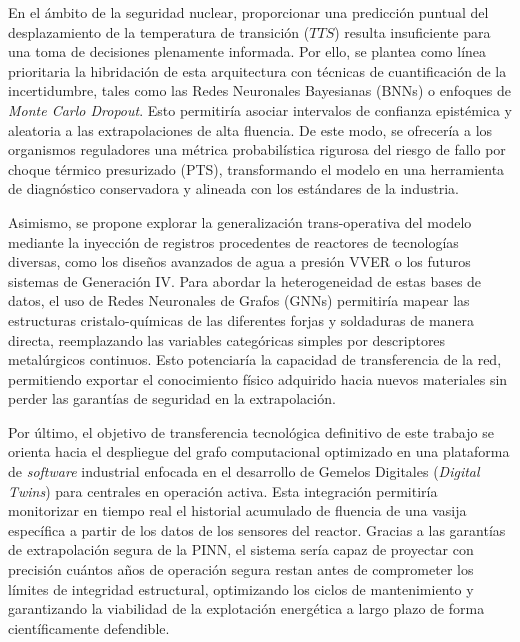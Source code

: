 \documentclass[a4paper, 12pt, twocolumn]{book}
\begin{document}
En el ámbito de la seguridad nuclear, proporcionar una predicción puntual del desplazamiento de la temperatura de transición ($TTS$) resulta insuficiente para una toma de decisiones plenamente informada. Por ello, se plantea como línea prioritaria la hibridación de esta arquitectura con técnicas de cuantificación de la incertidumbre, tales como las Redes Neuronales Bayesianas (BNNs) o enfoques de \textit{Monte Carlo Dropout}. Esto permitiría asociar intervalos de confianza epistémica y aleatoria a las extrapolaciones de alta fluencia. De este modo, se ofrecería a los organismos reguladores una métrica probabilística rigurosa del riesgo de fallo por choque térmico presurizado (PTS), transformando el modelo en una herramienta de diagnóstico conservadora y alineada con los estándares de la industria.

Asimismo, se propone explorar la generalización trans-operativa del modelo mediante la inyección de registros procedentes de reactores de tecnologías diversas, como los diseños avanzados de agua a presión VVER o los futuros sistemas de Generación IV. Para abordar la heterogeneidad de estas bases de datos, el uso de Redes Neuronales de Grafos (GNNs) permitiría mapear las estructuras cristalo-químicas de las diferentes forjas y soldaduras de manera directa, reemplazando las variables categóricas simples por descriptores metalúrgicos continuos. Esto potenciaría la capacidad de transferencia de la red, permitiendo exportar el conocimiento físico adquirido hacia nuevos materiales sin perder las garantías de seguridad en la extrapolación.

Por último, el objetivo de transferencia tecnológica definitivo de este trabajo se orienta hacia el despliegue del grafo computacional optimizado en una plataforma de \textit{software} industrial enfocada en el desarrollo de Gemelos Digitales (\textit{Digital Twins}) para centrales en operación activa. Esta integración permitiría monitorizar en tiempo real el historial acumulado de fluencia de una vasija específica a partir de los datos de los sensores del reactor. Gracias a las garantías de extrapolación segura de la PINN, el sistema sería capaz de proyectar con precisión cuántos años de operación segura restan antes de comprometer los límites de integridad estructural, optimizando los ciclos de mantenimiento y garantizando la viabilidad de la explotación energética a largo plazo de forma científicamente defendible.

\nocite{*}
\printbibliography[title={Bibliografía}]
\end{document}
